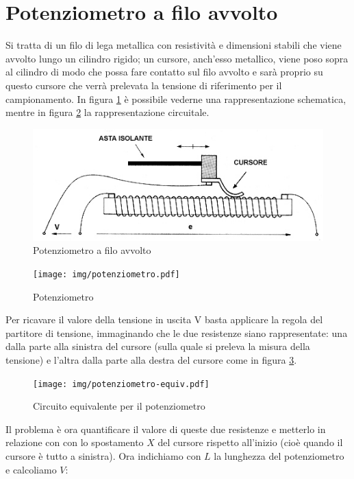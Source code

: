 \section{Potenziometro a filo avvolto}\label{sec:filoavvolto}
Si tratta di un filo di lega metallica con resistività e dimensioni
stabili che viene avvolto lungo un cilindro rigido; un cursore,
anch'esso metallico, viene poso sopra al cilindro di modo che possa
fare contatto sul filo avvolto e sarà proprio su questo cursore che
verrà prelevata la tensione di riferimento per il campionamento. In
figura \ref{fig:filoavvolto} è possibile vederne una
rappresentazione schematica, mentre in figura \ref{fig:potenziometro}
la rappresentazione circuitale.

\begin{figure}[htbp]
	\centering
	\includegraphics[scale=0.5]{img/filoavvolto.png}
	\caption{Potenziometro a filo avvolto\label{fig:filoavvolto}}
\end{figure}

\begin{figure}[htbp]
	\centering
	\texttt{[image: img/potenziometro.pdf]}
	\caption{Potenziometro\label{fig:potenziometro}}
\end{figure}

Per ricavare il valore della tensione in uscita V basta applicare la
regola del partitore di tensione, immaginando che le due resistenze
siano rappresentate: una dalla parte alla sinistra del cursore (sulla
quale si preleva la misura della tensione) e l'altra dalla parte alla
destra del cursore come in figura \ref{fig:potenziometroequiv}.

\begin{figure}[htbp]
	\centering
	\texttt{[image: img/potenziometro-equiv.pdf]}
	\caption{Circuito equivalente
per il potenziometro\label{fig:potenziometroequiv}}
\end{figure}

Il problema è ora quantificare il valore di queste
due resistenze e metterlo in relazione con con lo spostamento $X$ del
cursore rispetto all'inizio (cioè quando il cursore è tutto a
sinistra). Ora indichiamo con $L$ la lunghezza del potenziometro e
calcoliamo $V$:

